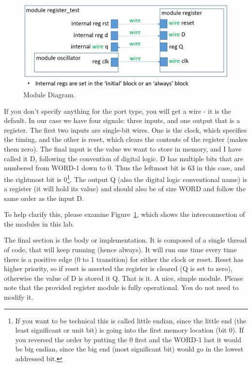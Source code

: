\begin{figure}
	\caption{Module Diagram.}\label{fig:modulediagram}
	\begin{center}
		\includegraphics[width=4.75in]{../images/register_test_module_diagram.png}
	\end{center}
\end{figure}

If you don't specify anything for the port type, you will get a wire - it is the default.  In our case we have four signals: three inputs, and one output that is a register.  The first two inputs are single-bit wires.  One is the clock, which specifies the timing, and the other is reset, which clears the contents of the register (makes them zero).  The final input is the value we want to store in memory, and I have called it D, following the convention of digital logic.  D has multiple bits that are numbered from WORD-1 down to 0.  Thus the leftmost bit is 63 in this case, and the rightmost bit is 0\footnote{If you want to be technical this is called little endian, since the little end (the least significant or unit bit) is going into the first memory location (bit 0).  If you reversed the order by putting the 0 first and the WORD-1 last it would be big endian, since the big end (most significant bit) would go in the lowest addressed bit.}.  The output Q (also the digital logic conventional name) is a register (it will hold its value) and should also be of size WORD and follow the same order as the input D.

To help clarify this, please examine Figure~\ref{fig:modulediagram}, which shows the interconnection of the modules in this lab.

The final section is the body or implementation.  It is composed of a single thread of code, that will keep running (hence always).  It will run one time every time there is a positive edge (0 to 1 transition) for either the clock or reset.  Reset has higher priority, so if reset is asserted the register is cleared (Q is set to zero), otherwise the value of D is stored it Q.  That is it.  A nice, simple module.  Please note that the provided register module is fully operational.  You do not need to modify it.

